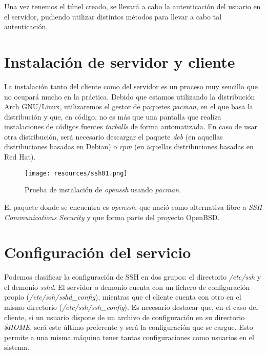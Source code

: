\documentclass[a4paper, 11pt, titlepage]{article}
\begin{document}
    Una vez tenemos el túnel creado, se llevará a cabo la autenticación del usuario en el 
    servidor, pudiendo utilizar distintos métodos para llevar a cabo tal autenticación.

\section{Instalación de servidor y cliente}

    La instalación tanto del cliente como del servidor es un proceso muy sencillo que no 
    ocupará mucho en la práctica. Debido que estamos utilizando la distribución Arch GNU/Linux, 
    utilizaremos el gestor de paquetes \textit{pacman}, en el que basa la distribución y que, 
    en código, no es más que una pantalla que realiza instalaciones de códigos fuentes \textit{tarballs}
    de forma automatizada. En caso de usar otra distribución, será necesario descargar el paquete 
    \textit{deb} (en aquellas distribuciones basadas en Debian) o \textit{rpm} (en aquellas distribuciones 
    basadas en Red Hat).

    \begin{figure}[htp]
        \centering
        \texttt{[image: resources/ssh01.png]}
        \caption{Prueba de instalación de \textit{openssh} usando \textit{pacman}.}
        \label{ssh01}
    \end{figure}

    El paquete donde se encuentra es \textit{openssh}, que nació como alternativa libre a \textit{SSH 
    Communications Security} y que forma parte del proyecto OpenBSD.

\section{Configuración del servicio}

    Podemos clasificar la configuración de SSH en dos grupos: el directorio \textit{/etc/ssh} y el demonio 
    \textit{sshd}. El servidor o demonio cuenta con un fichero de configuración propio (\textit{/etc/ssh/sshd\_config}), 
    mientras que el cliente cuenta con otro en el mismo directorio (\textit{/etc/ssh/ssh\_config}). Es necesario 
    destacar que, en el caso del cliente, si un usuario dispone de un archivo de configuración 
    en su directorio \textit{\$HOME}, será este último preferente y será la configuración que se 
    cargue. Esto permite a una misma máquina tener tantas configuraciones como usuarios en el sistema.
    
\end{document}
